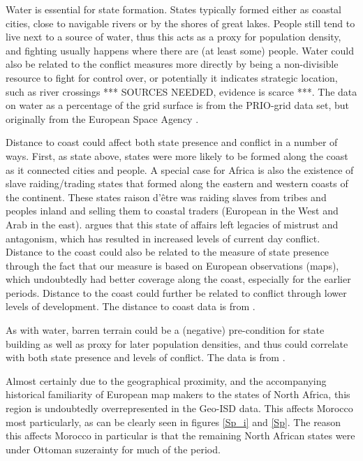 \documentclass[12pt]{article}
\begin{document}
Water is essential for state formation. States typically formed either as
coastal cities, close to navigable rivers or by the shores of great lakes.
People still tend to live next to a source of water, thus this acts as a proxy
for population density, and fighting usually happens where there are (at least
some) people.  Water could also be related to the conflict measures more
directly by being a non-divisible resource to fight for control over, or
potentially it indicates strategic location, such as river crossings *** SOURCES
NEEDED, evidence is scarce ***. The data on water as a percentage of the grid
surface is from the PRIO-grid data set, but originally from the European Space
Agency \citep{Bontemps2009}.

Distance to coast could affect both state presence and conflict in a number of
ways. First, as state above, states were more likely to be formed along the
coast as it connected cities and people. A special case for Africa is also the
existence of slave raiding/trading states that formed along the eastern and
western coasts of the continent. These states raison d'être was raiding slaves
from tribes and peoples inland and selling them to coastal traders (European in
the West and Arab in the east). \citet{Nunn2008} argues that this state of
affairs left legacies of mistrust and antagonism, which has resulted in
increased levels of current day conflict. Distance to the coast could also be
related to the measure of state presence through the fact that our measure is
based on European observations (maps), which undoubtedly had better coverage
along the coast, especially for the earlier periods. Distance to the coast could
further be related to conflict through lower levels of development. The distance
to coast data is from \citet{Wessel1996}.

As with water, barren terrain could be a (negative) pre-condition for state
building as well as proxy for later population densities, and thus could
correlate with both state presence and levels of conflict. The data is from
\citet{Bontemps2009}.

Almost certainly due to the geographical proximity, and the accompanying
historical familiarity of European map makers to the states of North Africa,
this region is undoubtedly overrepresented in the Geo-ISD data. This affects
Morocco most particularly, as can be clearly seen in figures \ref{Sp_i} and
\ref{Sp}. The reason this affects Morocco in particular is that the remaining
North African states were under Ottoman suzerainty for much of the period.
\end{document}
